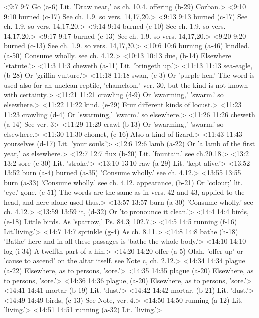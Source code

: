 <9:7 9:7  Go (a-6)  Lit. 'Draw near,' as ch. 10.4.
  offering (b-29)  Corban.>
<9:10 9:10  burned (c-17) See ch. 1.9. so vers. 14,17,20.>
<9:13 9:13  burned (c-17) See ch. 1.9. so vers. 14,17,20.>
<9:14 9:14  burned (c-10) See ch. 1.9. so vers. 14,17,20.>
<9:17 9:17  burned (c-13) See ch. 1.9. so vers. 14,17,20.>
<9:20 9:20  burned (c-13)  See ch. 1.9. so vers. 14,17,20.>
<10:6 10:6  burning (a-46)  kindled. (a-50)
  Consume wholly. see ch. 4.12.>
<10:13 10:13  due, (b-14)  Elsewhere 'statute.'>
<11:3 11:3  cheweth (a-11)  Lit. 'bringeth up.'>
<11:13 11:13  sea-eagle, (b-28)  Or 'griffin vulture.'>
<11:18 11:18  swan, (c-3)  Or 'purple hen.' The word is used also for an unclean  reptile, 'chameleon,' ver. 30, but the kind is not known with  certainty.>
<11:21 11:21  crawling (d-9) Or 'swarming,' 'swarm.' so elsewhere.>
<11:22 11:22  kind. (e-29)  Four different kinds of locust.>
<11:23 11:23  crawling (d-4)  Or 'swarming,' 'swarm.' so elsewhere.>
<11:26 11:26  cheweth (a-14)  See ver. 3>
<11:29 11:29  crawl (b-13)  Or 'swarming,' 'swarm.' so elsewhere.>
<11:30 11:30  chomet, (c-16)  Also a kind of lizard.>
<11:43 11:43  yourselves (d-17)  Lit. 'your souls.'>
<12:6 12:6  lamb (a-22)  Or 'a lamb of the first year,' as elsewhere.>
<12:7 12:7  flux (b-20)  Lit. 'fountain.' see ch.20.18.>
<13:2 13:2  sore (c-30)  Lit. 'stroke.'>
<13:10 13:10  raw (a-29)  Lit. 'kept alive.'>
<13:52 13:52  burn (a-4)  burned (a-35)
  'Consume wholly.' see ch. 4.12.>
<13:55 13:55  burn (a-33) 'Consume wholly.' see ch. 4.12.
  appearance, (b-21)  Or 'colour;' lit. 'eye.'
  gone. (c-51)  The words are the same as in vers. 42 and 43, applied to the  head, and here alone used thus.>
<13:57 13:57  burn (a-30)  'Consume wholly.' see ch. 4.12.>
<13:59 13:59  it, (d-32)  Or 'to pronounce it clean.'>
<14:4 14:4  birds, (e-18)  Little birds. As 'sparrow,' Ps. 84.3; 102.7.>
<14:5 14:5  running (f-16)  Lit.'living.'>
<14:7 14:7  sprinkle (g-4)  As ch. 8.11.>
<14:8 14:8  bathe (h-18)  'Bathe' here and in all these passages is 'bathe the whole  body.'>
<14:10 14:10  log (i-34)  A twelfth part of a hin.>
<14:20 14:20  offer (a-5)  Olah, 'offer up' or 'cause to ascend' on the altar itself.  see Note c, ch. 2.12.>
<14:34 14:34  plague (a-22) Elsewhere, as to persons, 'sore.'>
<14:35 14:35  plague (a-20) Elsewhere, as to persons, 'sore.'>
<14:36 14:36  plague, (a-20)  Elsewhere, as to persons, 'sore.'>
<14:41 14:41  mortar (b-19) Lit. 'dust.'>
<14:42 14:42  mortar, (b-21)  Lit. 'dust.'>
<14:49 14:49  birds, (c-13)  See Note, ver. 4.>
<14:50 14:50  running (a-12) Lit. 'living.'>
<14:51 14:51  running (a-32) Lit. 'living.'>
